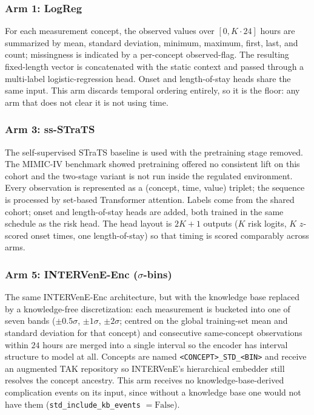 \subsubsection*{Arm 1: LogReg}
For each measurement concept, the observed values over $[0, K \cdot 24]$
hours are summarized by mean, standard deviation, minimum, maximum,
first, last, and count; missingness is indicated by a per-concept
observed-flag. The resulting fixed-length vector is concatenated with the
static context and passed through a multi-label logistic-regression
head. Onset and length-of-stay heads share the same input. This arm
discards temporal ordering entirely, so it is the floor: any arm that
does not clear it is not using time.

\subsubsection*{Arm 3: ss-STraTS}
The self-supervised STraTS \citep{tipirneni2022strats} baseline is used
with the pretraining stage removed. The MIMIC-IV benchmark showed
pretraining offered no consistent lift on this cohort and the two-stage
variant is not run inside the regulated environment. Every observation
is represented as a (concept, time, value) triplet; the sequence is
processed by set-based Transformer attention. Labels come from the
shared cohort; onset and length-of-stay heads are added, both trained
in the same schedule as the risk head. The head layout is $2K + 1$
outputs ($K$ risk logits, $K$ $z$-scored onset times, one length-of-stay)
so that timing is scored comparably across arms.

\subsubsection*{Arm 5: INTERVenE-Enc ($\sigma$-bins)}
The same INTERVenE-Enc architecture, but with the knowledge base
replaced by a knowledge-free discretization: each measurement is
bucketed into one of seven bands ($\pm 0.5\sigma$, $\pm 1\sigma$,
$\pm 2\sigma$; centred on the global training-set mean and standard
deviation for that concept) and consecutive same-concept observations
within $24$ hours are merged into a single interval so the encoder has
interval structure to model at all. Concepts are named
\texttt{<CONCEPT>\_STD\_<BIN>} and receive an augmented TAK repository
so INTERVenE's hierarchical embedder still resolves the concept
ancestry. This arm receives no knowledge-base-derived complication
events on its input, since without a knowledge base one would not have
them (\texttt{std\_include\_kb\_events} $= \mathrm{False}$).

